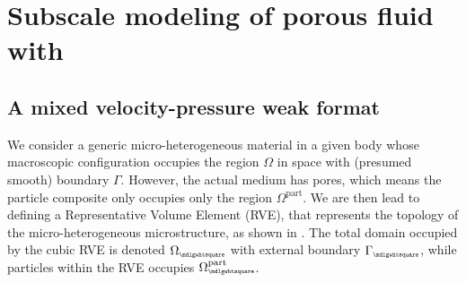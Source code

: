 \documentclass[12pt,a4paper]{article}
\renewcommand{\Box}{\mdlgwhtsquare}
\newcommand{\particle}{\mathrm{part}}
\newcommand{\rve}{
  {\mathchoice
   {\mbox{\scalebox{0.67}{$\Box$}}}
   {\mbox{\scalebox{0.67}{$\Box$}}}
   {\mbox{\scalebox{0.5}{$\Box$}}}
   {\mbox{\scalebox{0.375}{$\Box$}}}
  }
}
\begin{document}
\section{Subscale modeling of porous fluid with }

\subsection{A mixed velocity-pressure weak format}

We consider a generic micro-heterogeneous material in a given body whose macroscopic configuration occupies the region $\Omega$ in space with (presumed smooth) boundary $\Gamma$.
However, the actual medium has pores, which means the particle composite only occupies only the region $\Omega^\particle$.
We are then lead to defining a Representative Volume Element (RVE), that represents the topology of the micro-heterogeneous microstructure, as shown in .
The total domain occupied by the cubic RVE is denoted $\Omega_\rve$ with external boundary $\Gamma_\rve$, while particles within the RVE occupies $\Omega_\rve^\particle$.
\end{document}
